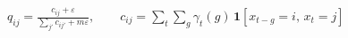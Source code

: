 \documentclass[12pt,border=8pt]{standalone}
\begin{document}
\Large
\begin{math}\displaystyle
q_{ij} = \frac{c_{ij} + \varepsilon}{\sum_{j'} c_{ij'} + m\varepsilon}, \qquad c_{ij} = \sum_{t} \sum_{g} \gamma_t(g) \, \mathbf{1}[x_{t-g} = i,\, x_t = j]
\end{math}
\end{document}
